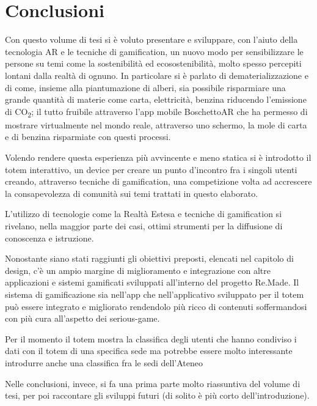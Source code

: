 \chapter{Conclusioni}
Con questo volume di tesi si è voluto presentare e sviluppare, con l'aiuto della tecnologia AR e le tecniche di gamification, un nuovo modo per sensibilizzare le persone su temi come la sostenibilità ed ecosostenibilità, molto spesso percepiti lontani dalla realtà di ognuno. In particolare si è parlato di dematerializzazione e di come, insieme alla piantumazione di alberi, sia possibile risparmiare una grande quantità di materie come carta, elettricità, benzina riducendo l'emissione di CO\textsubscript{2}; il tutto fruibile attraverso l'app mobile BoschettoAR che ha permesso di mostrare virtualmente nel mondo reale, attraverso uno schermo, la mole di carta e di benzina risparmiate con questi processi.

Volendo rendere questa esperienza più avvincente e meno statica si è introdotto il totem interattivo, un device per creare un punto d'incontro fra i singoli utenti creando, attraverso tecniche di gamification, una competizione volta ad accrescere la consapevolezza di comunità sui temi trattati in questo elaborato.

L'utilizzo di tecnologie come la Realtà Estesa e tecniche di gamification si rivelano, nella maggior parte dei casi, ottimi strumenti per la diffusione di conoscenza e istruzione.


Nonostante siano stati raggiunti gli obiettivi preposti, elencati nel capitolo di design, c'è un ampio margine di miglioramento e integrazione con altre applicazioni e sistemi gamificati sviluppati all'interno del progetto Re.Made.
Il sistema di gamificazione sia nell'app che nell'applicativo sviluppato per il totem può essere integrato e migliorato rendendolo più ricco di contenuti soffermandosi con più cura all'aspetto dei serious-game.

Per il momento il totem mostra la classifica degli utenti che hanno condiviso i dati con il totem di una specifica sede ma potrebbe essere molto interessante introdurre anche una classifica fra le sedi dell'Ateneo

Nelle conclusioni, invece, si fa una prima parte molto riassuntiva del volume di tesi, per poi raccontare gli sviluppi futuri (di solito è più corto dell’introduzione). 